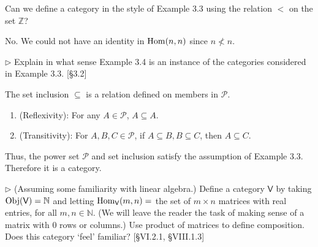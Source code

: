 \begin{problem}[3.4]
  Can we define a category in the style of Example 3.3 using the relation $<$ on
  the set $\mathbb{Z}$?
\end{problem}

\begin{solution}
No. We could not have an identity in $\mathrm{Hom}(n,n)$ since $n \nless n$.
\end{solution}

\begin{problem}[3.5]
  $\rhd$ Explain in what sense Example 3.4 is an instance of the categories
  considered in Example 3.3. [\S 3.2]
\end{problem}

\begin{solution}
The set inclusion $\subseteq$ is a relation defined on members in $\mathscr{P}$.
\begin{enumerate}
\item (Reflexivity): For any $A\in \mathscr{P}$, $A\subseteq A$.
\item (Transitivity): For $A, B, C\in \mathscr{P}$, if $A\subseteq B, B\subseteq C$, then $A\subseteq C$.
\end{enumerate} 
Thus, the power set $\mathscr{P}$ and set inclusion satisfy the assumption of Example 3.3. Therefore it is a category.
\end{solution}

\begin{problem}[3.6]
  $\rhd$ (Assuming some familiarity with linear algebra.) Define a category
  $\mathsf{V}$ by taking $\mathrm{Obj}(\mathsf{V}) = \mathbb{N}$ and letting
  $\mathrm{Hom}_{\mathsf{V}}(m,n) = $ the set of $m\times n$ matrices with real
  entries, for all $m,n\in\mathbb{N}$. (We will leave the reader the task of
  making sense of a matrix with 0 rows or columns.) Use product of matrices to
  define composition. Does this category `feel' familiar? [\S VI.2.1, \S VIII.1.3]
\end{problem}


